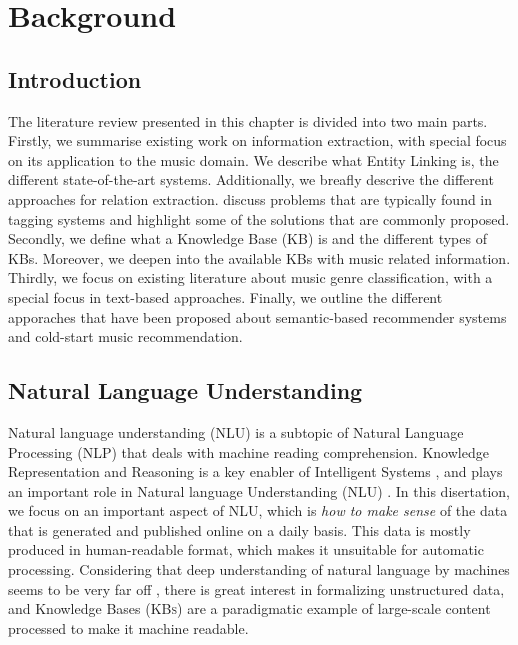
\chapter{Background}
\label{sec:SOA}

\section{Introduction}
\label{sec:SOA:Introduction}

The literature review presented in this chapter is divided into two main parts.
Firstly, we summarise existing work on information extraction, with special focus on its application to the music domain.
We describe what Entity Linking is, the different state-of-the-art systems. Additionally, we breafly descrive the different approaches for relation extraction. discuss problems that are typically found in tagging systems and highlight some of the solutions that are commonly proposed. 
Secondly, we define what a Knowledge Base (KB) is and the different types of KBs. Moreover, we deepen into the available KBs with music related information.
Thirdly, we focus on existing literature about music genre classification, with a special focus in text-based approaches.
Finally, we outline the different apporaches that have been proposed about semantic-based recommender systems and cold-start music recommendation.


\section{Natural Language Understanding}
\label{sec:SOA:nlu}

Natural language understanding (NLU) is a subtopic of Natural Language Processing (NLP) that deals with machine reading comprehension.
Knowledge Representation and Reasoning is a key enabler of Intelligent Systems \cite{Suchaneketal2007}, and plays an important role in Natural language Understanding (NLU) \cite{BaralandDeGiacomo2015}.
In this disertation, we focus on an important aspect of NLU, which is \textit{how to make sense} of the data that is generated and published online on a daily basis. This data is mostly produced in human-readable format, which makes it unsuitable for automatic processing. Considering that deep understanding of natural language by machines seems to be very far off \cite{CambriaandWhite2014}, there is great interest in formalizing unstructured data, and Knowledge Bases (\textsc{KBs}) are a paradigmatic example of large-scale content processed to make it machine readable.

